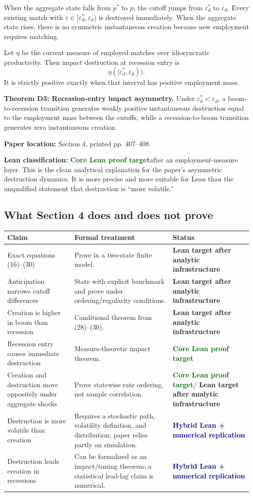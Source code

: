 \documentclass[11pt]{article}
\newcommand{\epsd}{\varepsilon_d}
\newcommand{\paperloc}[1]{\textbf{Paper location:} #1}
\newcommand{\leanclass}[1]{\textbf{Lean classification:} #1}
\newcommand{\core}{\textcolor{darkGreen}{\textbf{Core Lean proof target}}}
\newcommand{\infra}{\textcolor{darkAmber}{\textbf{Lean target after analytic infrastructure}}}
\newcommand{\hybrid}{\textcolor{navy}{\textbf{Hybrid Lean + numerical replication}}}
\newcommand{\resultname}[1]{\medskip\noindent\textbf{#1.}}
\begin{document}
When the aggregate state falls from $p^*$ to $p$, the cutoff jumps from $\epsd^*$ to $\epsd$. Every existing match with $\varepsilon\in[\epsd^*,\epsd)$ is destroyed immediately. When the aggregate state rises, there is no symmetric instantaneous creation because new employment requires matching.

Let $\eta$ be the current measure of employed matches over idiosyncratic productivity. Then impact destruction at recession entry is
\[
 \eta([\epsd^*,\epsd)).
\]
It is strictly positive exactly when that interval has positive employment mass.

\resultname{Theorem D3: Recession-entry impact asymmetry}
Under $\epsd^*<\epsd$, a boom-to-recession transition generates weakly positive instantaneous destruction equal to the employment mass between the cutoffs, while a recession-to-boom transition generates zero instantaneous creation.

\paperloc{Section 4, printed pp. 407--408.}

\leanclass{\core after an employment-measure layer.}
This is the clean analytical explanation for the paper's asymmetric destruction dynamics. It is more precise and more suitable for Lean than the unqualified statement that destruction is ``more volatile.''

\subsection{What Section 4 does and does not prove}

\begin{center}
\small
\begin{tabularx}{0.95\textwidth}{@{}p{}Xp{}@{}}
\toprule
Claim & Formal treatment & Status \\
\midrule
Exact equations (16)--(30) & Prove in a two-state finite model. & \infra \\
Anticipation narrows cutoff differences & State with explicit benchmark and prove under ordering/regularity conditions. & \infra \\
Creation is higher in boom than recession & Conditional theorem from (28)--(30). & \infra \\
Recession entry causes immediate destruction & Measure-theoretic impact theorem. & \core \\
Creation and destruction move oppositely under aggregate shocks & Prove statewise rate ordering, not sample correlation. & \core / \infra \\
Destruction is more volatile than creation & Requires a stochastic path, volatility definition, and distribution; paper relies partly on simulation. & \hybrid \\
Destruction leads creation in recessions & Can be formalized as an impact/timing theorem; a statistical lead-lag claim is numerical. & \hybrid \\
\bottomrule
\end{tabularx}
\end{center}
\end{document}
